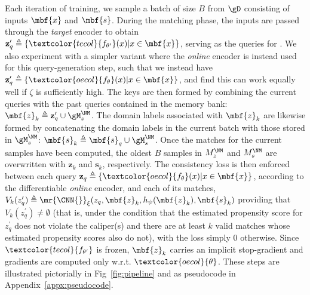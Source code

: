 Each iteration of training, we sample a batch of size $B$ from $\gD$ consisting of inputs $\mbf{x}$
and $\mbf{s}$.
%
During the matching phase, the inputs are passed through the \emph{target} encoder to obtain
$\mathbf{z}_q^\prime \triangleq \{ \textcolor{tecol}{f_{\theta^\prime} } (x) | x \in \mbf{x}\}$,
serving as the queries for \CNN{}.
%
We also experiment with a simpler variant where the \emph{online} encoder is instead used for this
query-generation step, such that we instead have $\mathbf{z}_q^\prime \triangleq
\{\textcolor{oecol}{f_{\theta}}(x) | x \in \mbf{x}\}$, and find this can work equally well if
$\zeta$ is sufficiently high.
%
The keys are then formed by combining the current queries with the past queries contained in the
memory bank: $\mbf{z}_k\triangleq \mathbf{z}_q^\prime \cup \gM^{\NM}_z$.
%
The domain labels associated with $\mbf{z}_k$ are likewise formed by concatenating the domain
labels in the current batch with those stored in $\gM^{\NM}_s$: $\mbf{s}_k \triangleq \mbf{s}_q \cup
\gM^{\NM}_s$.
%
Once the matches for the current samples have been computed, the oldest $B$ samples in $M^{\NM}_z$
and $M^{\NM}_s$ are overwritten with $\mathbf{z}_k$ and $\mathbf{s}_k$, respectively.
%
The consistency loss is then enforced between each query $\mathbf{z}_q \triangleq \{
  \textcolor{oecol}{f_{\theta}}(x) |
x \in \mbf{x}\} $, according to the differentiable \emph{online} encoder, and each of its matches,
$V_k(z_q^\prime) \triangleq \mr{\CNN{}}_\xi(z_q, \mbf{z}_k, h_\psi(\mbf{z}_k), \mbf{s}_k)$ providing
that $V_k(z_q^\prime) \neq \emptyset$ (that is, under the condition that the estimated propensity
score for $z_q^\prime$ does not violate the caliper(s) and there are at least $k$ valid matches
whose estimated propensity scores also do not), with the loss simply $0$ otherwise.
%
Since $\textcolor{tecol}{ f_{\theta^\prime} }$ is frozen, $\mbf{z}_k$ carries an implicit stop-gradient and gradients
are computed only w.r.t. $\textcolor{oecol}{ \theta}$.
These steps are illustrated pictorially in Fig~\ref{fig:pipeline} and as pseudocode in
Appendix~\ref{appx:pseudocode}.

